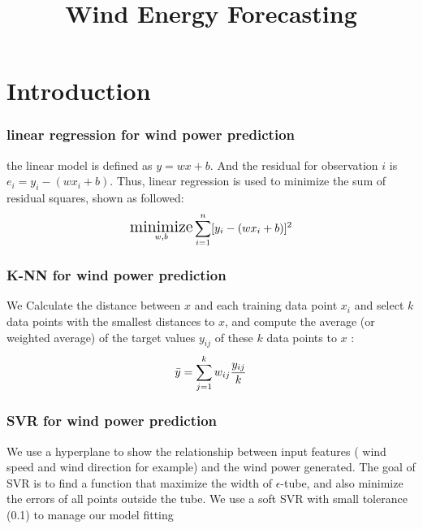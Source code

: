 \documentclass[a4paper, article, oneside, USenglish, IN5460]{memoir}
\title{ Wind Energy Forecasting }
\DeclareMathOperator*{\min}{\text{\Large minimize}}
\begin{document}
\shorthandoff{}

\projectfrontpage


\chapter*{Introduction}
\subsection{linear regression for wind power prediction}
the linear model is defined as $y=wx+b$.
And the residual for observation $i$ is $e_i =y_i -(wx_i+b)$. Thus, linear regression is used to minimize the sum of residual squares, shown as followed:
\begin{equation}
\begin{aligned}
\min_{w,b}\sum_{i=1}^{n} [y_i-(wx_i+b)]^2
\end{aligned}
\end{equation}
\newline


\subsection{K-NN for wind power prediction}
We Calculate the distance between $x$ and each training data point $x_i$ and select $k$ data points with the smallest distances to $x$, and compute the average (or weighted average) of the target values $y_{ij}$ of these $k$ data points to 
$x$ :
\begin{equation}
\begin{aligned}
\Bar{y} = \sum_{j=1}^{k} w_{ij}\frac{y_{ij}}{k}
\end{aligned}
\end{equation}
\newline

\subsection{SVR for wind power prediction}
We use a hyperplane to show the 
relationship between input features ( wind speed and wind direction for example) and the wind power generated. The goal of SVR is to find a function that maximize the width of $\epsilon$-tube, and also minimize the errors of all points outside the tube.
We use a soft SVR with small tolerance (0.1) to manage our model fitting

\newline
\end{document}

